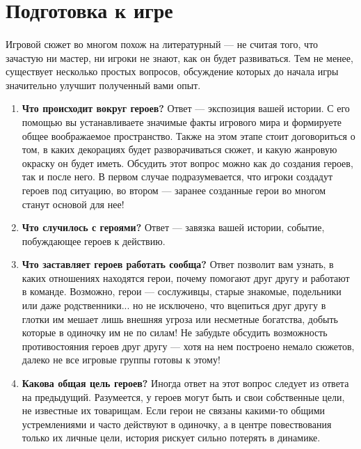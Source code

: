 \section{Подготовка к игре}
\paragraph{}
Игровой сюжет во многом похож на литературный — не считая того, что зачастую ни мастер, ни игроки не знают, как он будет развиваться. Тем не менее, существует несколько простых вопросов, обсуждение которых до начала игры значительно улучшит полученный вами опыт.
\begin{enumerate}
\item \textbf{Что происходит вокруг героев?}
\newline
Ответ — экспозиция вашей истории. С его помощью вы устанавливаете значимые факты игрового мира и формируете общее воображаемое пространство. Также на этом этапе стоит договориться о том, в каких декорациях будет разворачиваться сюжет, и какую жанровую окраску он будет иметь. Обсудить этот вопрос можно как до создания героев, так и после него. В первом случае подразумевается, что игроки создадут героев под ситуацию, во втором — заранее созданные герои во многом станут основой для нее!
\item \textbf{Что случилось с героями?}
\newline
Ответ — завязка вашей истории, событие, побуждающее героев к действию.
\item \textbf{Что заставляет героев работать сообща?}
\newline
Ответ позволит вам узнать, в каких отношениях находятся герои, почему помогают друг другу и работают в команде. Возможно, герои — сослуживцы, старые знакомые, подельники или даже родственники... но не исключено, что вцепиться друг другу в глотки им мешает лишь внешняя угроза или несметные богатства, добыть которые в одиночку им не по силам! Не забудьте обсудить возможность противостояния героев друг другу — хотя на нем построено немало сюжетов, далеко не все игровые группы готовы к этому!
\item \textbf{Какова общая цель героев?}
\newline
Иногда ответ на этот вопрос следует из ответа на предыдущий. Разумеется, у героев могут быть и свои собственные цели, не известные их товарищам. Если герои не связаны какими-то общими устремлениями и часто действуют в одиночку, а в центре повествования только их личные цели, история рискует сильно потерять в динамике. 
\end{enumerate}
